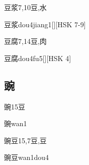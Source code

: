 \begin{Entry}{豆浆}{7,10}{⾖,⽔}
  \begin{Phonetics}{豆浆}{dou4jiang1}[][HSK 7-9]
  \end{Phonetics}
\end{Entry}

\begin{Entry}{豆腐}{7,14}{⾖,⾁}
  \begin{Phonetics}{豆腐}{dou4fu5}[][HSK 4]
  \end{Phonetics}
\end{Entry}

\subsection*{豌}

\begin{Entry}{豌}{15}{⾖}
  \begin{Phonetics}{豌}{wan1}
  \end{Phonetics}
\end{Entry}

\begin{Entry}{豌豆}{15,7}{⾖,⾖}
  \begin{Phonetics}{豌豆}{wan1dou4}
  \end{Phonetics}
\end{Entry}


